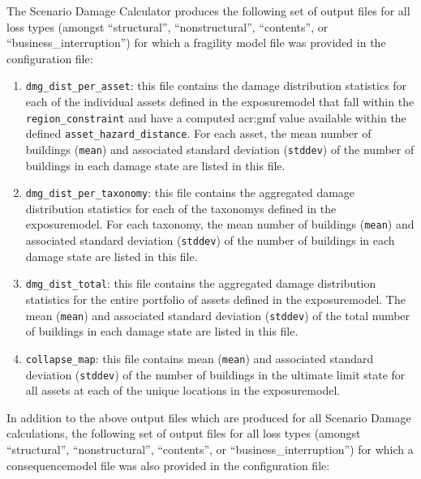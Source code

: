 The Scenario Damage Calculator produces the following set of output files for
all loss types (amongst ``structural'', ``nonstructural'', ``contents'', or
``business\_interruption'') for which a fragility model file was provided in
the configuration file:

\begin{enumerate}

  \item \Verb+dmg_dist_per_asset+: this file contains the damage distribution
    statistics for each of the individual \glspl{asset} defined in the
    \gls{exposuremodel} that fall within the \Verb+region_constraint+ and have
    a computed \gls{acr:gmf} value available within the defined
    \Verb+asset_hazard_distance+. For each \gls{asset}, the mean number of
    buildings (\Verb+mean+) and associated standard deviation (\Verb+stddev+)
    of the number of buildings in each damage state are listed in this file.

  \item \Verb+dmg_dist_per_taxonomy+: this file contains the aggregated damage
    distribution statistics for each of the \glspl{taxonomy} defined in the
    \gls{exposuremodel}. For each \gls{taxonomy}, the mean number of
    buildings (\Verb+mean+) and associated standard deviation (\Verb+stddev+)
    of the number of buildings in each damage state are listed in this file.

  \item \Verb+dmg_dist_total+: this file contains the aggregated damage
    distribution statistics for the entire portfolio of \glspl{asset} defined
    in the \gls{exposuremodel}. The mean (\Verb+mean+) and associated standard
    deviation (\Verb+stddev+) of the total number of buildings in each
    damage state are listed in this file.

  \item \Verb+collapse_map+: this file contains mean (\Verb+mean+) and
    associated standard deviation (\Verb+stddev+) of the number of buildings
    in the ultimate limit state for all \glspl{asset} at each of the unique
    locations in the \gls{exposuremodel}.

\end{enumerate}

In addition to the above output files which are produced for all Scenario
Damage calculations, the following set of output files for all loss types
(amongst ``structural'', ``nonstructural'', ``contents'', or
``business\_interruption'') for which a \gls{consequencemodel} file was also
provided in the configuration file:


